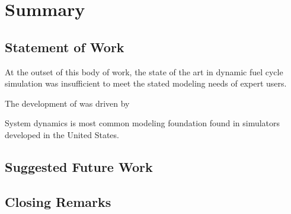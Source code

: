 \chapter{Summary}\label{ch:summary}

\section{Statement of Work}

At the outset of this body of work, the state of the art in dynamic fuel cycle
simulation was insufficient to meet the stated modeling needs of expert
users. 

The development of \Cyclus was driven by 

System dynamics is most common modeling foundation found in simulators
developed in the United States. 




\section{Suggested Future Work}

\section{Closing Remarks}
